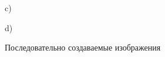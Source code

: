 \documentclass[14pt,a4paper,report]{report}
\begin{document}
\begin{figure}[h!]
\begin{minipage}[h]{0.47\linewidth}
\end{minipage}
\vfill
\begin{minipage}[h]{0.47\linewidth}
 c) \\
\end{minipage}
\hfill
\begin{minipage}[h]{0.47\linewidth}
 d) \\
\end{minipage}
\caption{Последовательно создаваемые изображения}
\label{ris:experimentalcorrelationsignals}
\end{figure}
\end{document}
